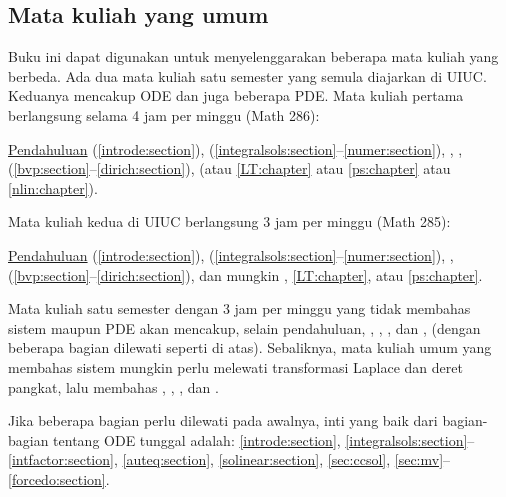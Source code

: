 \subsection{Mata kuliah yang umum}

Buku ini dapat digunakan untuk menyelenggarakan beberapa mata kuliah yang berbeda.
Ada dua mata kuliah satu semester yang semula diajarkan di UIUC\@.
Keduanya mencakup ODE dan juga beberapa PDE.
Mata kuliah pertama berlangsung selama 4 jam per minggu (Math 286):

\medskip

\noindent
\hyperref[intro:chapter]{Pendahuluan} (\ref{introde:section}),
 (\ref{integralsols:section}--\ref{numer:section}),
,
,
 (\ref{bvp:section}--\ref{dirich:section}),
 (atau
\ref{LT:chapter} atau \ref{ps:chapter} atau \ref{nlin:chapter}).

\medskip

Mata kuliah kedua di UIUC berlangsung 3 jam per minggu (Math 285):

\medskip

\noindent
\hyperref[intro:chapter]{Pendahuluan} (\ref{introde:section}),
 (\ref{integralsols:section}--\ref{numer:section}),
,
 (\ref{bvp:section}--\ref{dirich:section}),
dan mungkin ,
\ref{LT:chapter}, atau \ref{ps:chapter}.

\medskip

Mata kuliah satu semester dengan 3 jam per minggu yang tidak membahas sistem maupun PDE
akan mencakup, selain pendahuluan,
,
,
, dan ,
(dengan beberapa bagian dilewati seperti di atas).
Sebaliknya, mata kuliah umum yang membahas sistem mungkin perlu melewati transformasi Laplace dan deret pangkat,
lalu membahas
,
,
, dan .

\medskip

Jika beberapa bagian perlu dilewati pada awalnya, inti yang baik dari
bagian-bagian tentang ODE tunggal adalah:
\ref{introde:section},
\ref{integralsols:section}--\ref{intfactor:section},
\ref{auteq:section},
\ref{solinear:section},
\ref{sec:ccsol},
\ref{sec:mv}--\ref{forcedo:section}.


